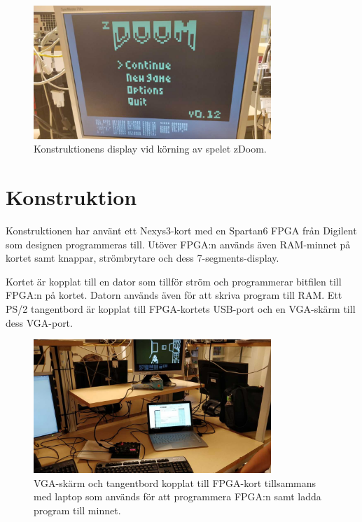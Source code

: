 \documentclass[main.tex]{subfiles}
\begin{document}
\begin{figure}
    \centering
    \includegraphics[width=0.8\textwidth,bb=0 0 1152 648]{img/monitor_small.jpg}
    \caption{Konstruktionens display vid körning av spelet zDoom.}
\end{figure}

\section{Konstruktion}
Konstruktionen har använt ett Nexys3-kort med en Spartan6 FPGA från Digilent
som designen programmeras till. Utöver FPGA:n används även RAM-minnet på kortet
samt knappar, strömbrytare och dess 7-segments-display.

Kortet är kopplat till en dator som tillför ström och programmerar bitfilen
till FPGA:n på kortet. Datorn används även för att skriva program till RAM.
Ett PS/2 tangentbord är kopplat till FPGA-kortets USB-port och en VGA-skärm
till dess VGA-port.  

\begin{figure}
    \centering
    \includegraphics[width=0.8\textwidth,bb=0 0 1152 648]{img/setup_small.jpg}
    \caption{VGA-skärm och tangentbord kopplat till FPGA-kort tillsammans med
    laptop som används för att programmera FPGA:n samt ladda program till
    minnet.}
\end{figure}
\end{document}
